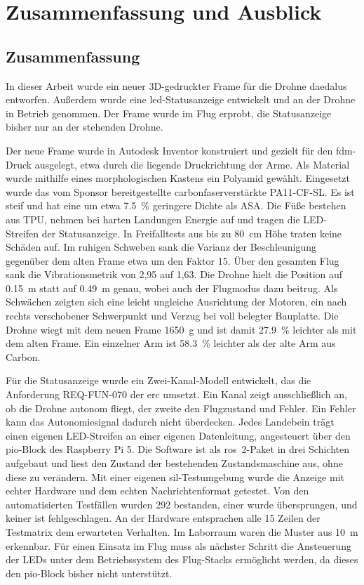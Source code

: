 \chapter{Zusammenfassung und Ausblick}
\label{ch:Zusammenfassung}

\section{Zusammenfassung}
\label{sec:Zusammenfassung}

In dieser Arbeit wurde ein neuer 3D-gedruckter Frame für die Drohne \gls{daedalus} entworfen.
Außerdem wurde eine \gls{led}-Statusanzeige entwickelt und an der Drohne in Betrieb genommen.
Der Frame wurde im Flug erprobt, die Statusanzeige bisher nur an der stehenden Drohne.

Der neue Frame wurde in Autodesk Inventor konstruiert und gezielt für den \gls{fdm}-Druck ausgelegt, etwa durch die
liegende Druckrichtung der Arme.
Als Material wurde mithilfe eines morphologischen Kastens ein Polyamid gewählt.
Eingesetzt wurde das vom Sponsor bereitgestellte carbonfaserverstärkte PA11-CF-SL.
Es ist steif und hat eine um etwa \SI{7,5}{\percent} geringere Dichte als ASA.
Die Füße bestehen aus TPU, nehmen bei harten Landungen Energie auf und tragen die LED-Streifen der Statusanzeige.
In Freifalltests aus bis zu \SI{80}{\centi\metre} Höhe traten keine Schäden auf.
Im ruhigen Schweben sank die Varianz der Beschleunigung gegenüber dem alten Frame etwa um den Faktor 15.
Über den gesamten Flug sank die Vibrationsmetrik von 2,95 auf 1,63.
Die Drohne hielt die Position auf \SI{0,15}{\metre} statt auf \SI{0,49}{\metre} genau, wobei auch der Flugmodus dazu
beitrug.
Als Schwächen zeigten sich eine leicht ungleiche Ausrichtung der Motoren, ein nach rechts verschobener Schwerpunkt und
Verzug bei voll belegter Bauplatte.
Die Drohne wiegt mit dem neuen Frame \SI{1650}{\gram} und ist damit \SI{27,9}{\percent} leichter als mit dem alten
Frame.
Ein einzelner Arm ist \SI{58,3}{\percent} leichter als der alte Arm aus Carbon.

Für die Statusanzeige wurde ein Zwei-Kanal-Modell entwickelt, das die Anforderung REQ-FUN-070 der \gls{erc} umsetzt.
Ein Kanal zeigt ausschließlich an, ob die Drohne autonom fliegt, der zweite den Flugzustand und Fehler.
Ein Fehler kann das Autonomiesignal dadurch nicht überdecken.
Jedes Landebein trägt einen eigenen LED-Streifen an einer eigenen Datenleitung, angesteuert über den \gls{pio}-Block
des Raspberry Pi 5.
Die Software ist als \gls{ros}~2-Paket in drei Schichten aufgebaut und liest den Zustand der bestehenden
Zustandsmaschine aus, ohne diese zu verändern.
Mit einer eigenen \gls{sil}-Testumgebung wurde die Anzeige mit echter Hardware und dem echten Nachrichtenformat
getestet.
Von den automatisierten Testfällen wurden 292 bestanden, einer wurde übersprungen, und keiner ist fehlgeschlagen.
An der Hardware entsprachen alle 15 Zeilen der Testmatrix dem erwarteten Verhalten.
Im Laborraum waren die Muster aus \SI{10}{\metre} erkennbar.
Für einen Einsatz im Flug muss als nächster Schritt die Ansteuerung der LEDs unter dem Betriebssystem des Flug-Stacks
ermöglicht werden, da dieses den \gls{pio}-Block bisher nicht unterstützt.

